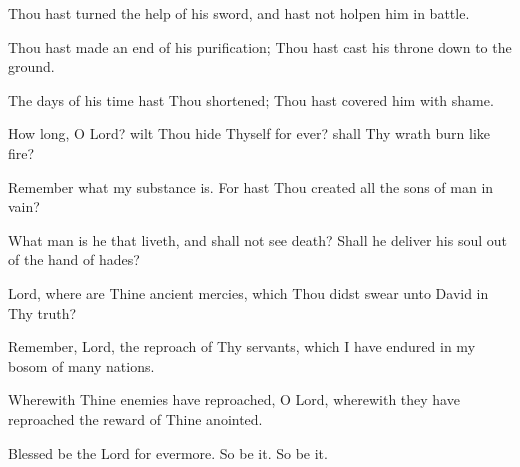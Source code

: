 Thou hast turned the help of his sword, and hast not holpen him in battle.

Thou hast made an end of his purification; Thou hast cast his throne down to the ground.

The days of his time hast Thou shortened;  Thou hast covered him with shame.

How long, O Lord? wilt Thou hide Thyself for ever? shall Thy wrath burn like fire?

Remember what my substance is. For hast Thou created all the sons of man in vain?

What man is he that liveth, and shall not see death? Shall he deliver his soul out of the hand of hades?

Lord, where are Thine ancient mercies, which Thou didst swear unto David in Thy truth?

Remember, Lord, the reproach of Thy servants, which I have endured in my bosom of many nations.

Wherewith Thine enemies have reproached, O Lord, wherewith they have reproached the reward of Thine anointed.

Blessed be the Lord for evermore. So be it. So be it.
